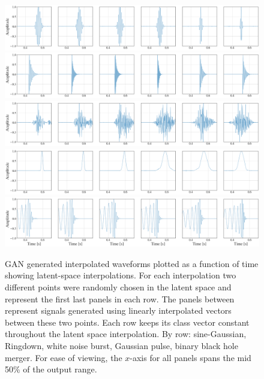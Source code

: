 \documentclass[12pt]{iopart}
\begin{document}
\begin{figure}[!h]
    \centering
    \includegraphics[width=\textwidth]{figures/generations/z_interp_sg.png}
    \includegraphics[width=\textwidth]{figures/generations/z_interp_rd.png}
    \includegraphics[width=\textwidth]{figures/generations/z_interp_wnb.png}
    \includegraphics[width=\textwidth]{figures/generations/z_interp_blip.png}
    \includegraphics[width=\textwidth]{figures/generations/z_interp_bbh.png}
    \caption{\ac{GAN} generated interpolated waveforms plotted as a function of time showing latent-space interpolations. For each interpolation two different points were randomly chosen in the latent space and represent the first last panels in each row. The panels between represent signals generated using linearly interpolated vectors between these two points. Each row keeps its class vector constant throughout the latent space interpolation. By row: sine-Gaussian, Ringdown, white noise burst, Gaussian pulse, binary black hole merger. For ease of viewing, the $x$-axis for all panels spans the mid 50\% of the output range.}
    \label{fig:z_interp}
\end{figure}
\end{document}
